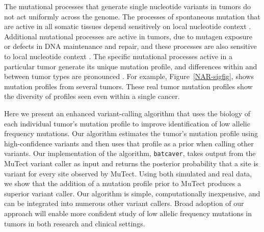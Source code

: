 \documentclass[a4,center,fleqn]{NAR}
\begin{document}
The mutational processes that generate single nucleotide variants in tumors do not act uniformly across the genome.
The processes of spontaneous mutation that are active in all somatic tissues depend sensitively on local nucleotide context \citep{Nik-Zainal2012a,Alexandrov2015,Lee-Six2018}. 
Additional mutational processes are active in tumors, due to mutagen exposure or defects in DNA maintenance and repair, and these processes are also sensitive to local nucleotide context \citep{Alexandrov2013a,Helleday2014a,Nik-Zainal2016,Kandoth2013,Alexandrov2016}.
The specific mutational processes active in a particular tumor generate its unique mutation profile, and differences within and between tumor types are pronounced \cite{Stephens2005, Burrell2013a, Nakamura2015, Witkiewicz2015, Kumar2016}.
For example, Figure~\ref{NAR-sigfig}, shows mutation profiles from several tumors.
These real tumor mutation profiles show the diversity of profiles seen even within a single cancer.

Here we present an enhanced variant-calling algorithm that uses the biology of each individual tumor's mutation profile to improve identification of low allelic frequency mutations.
Our algorithm estimates the tumor's mutation profile using high-confidence variants and then uses that profile as a prior when calling other variants.
Our implementation of the algorithm, \texttt{batcaver}, takes output from the MuTect variant caller as input and returns the posterior probability that a site is variant for every site observed by MuTect.
Using both simulated and real data, we show that the addition of a mutation profile prior to MuTect produces a superior variant caller.
Our algorithm is simple, computationally inexpensive, and can be integrated into numerous other variant callers.
Broad adoption of our approach will enable more confident study of low allelic frequency mutations in tumors in both research and clinical settings.
\end{document}
